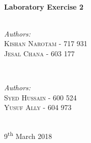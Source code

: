 \documentclass[10pt, conference]{IEEEtran}
\begin{document}
\begin{titlepage}

\HRule \\[0.4cm]
{ \huge \bfseries Laboratory Exercise 2}\\[0.4cm] %
\HRule \\[1.5cm]
 

\begin{minipage}{0.4\textwidth}
\begin{flushleft} \large
	\emph{Authors:}\\
	\textsc{Kishan Narotam - 717 931\\Jesal Chana - 603 177} 
\end{flushleft}
\end{minipage}
~
\begin{minipage}{0.4\textwidth}
\begin{flushright} \large
	\emph{Authors:} \\
	\textsc{Syed Hussain - 600 524\\Yusuf Ally - 604 973} 
\end{flushright}
\end{minipage}\\[2cm]


{\large 9\textsuperscript{th} March 2018}\\[2cm] %


\vfill %

\end{titlepage}


\end{document}
